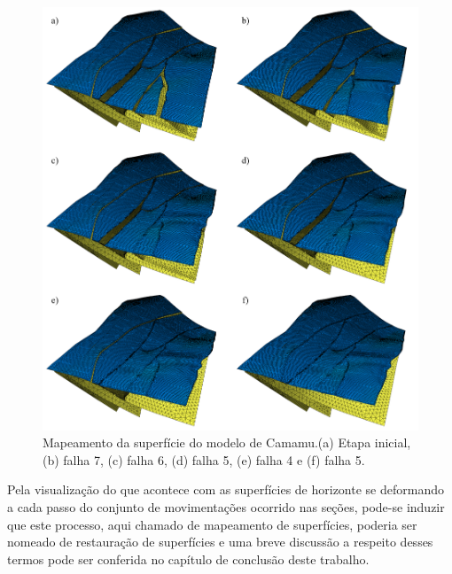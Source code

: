 \begin{figure} [H]
  \begin{center}
    \includegraphics[width=\textwidth]{images/fig-example-2-13}
    \caption{Mapeamento da superfície do modelo de Camamu.(a) Etapa inicial, (b) falha 7, (c) falha 6, (d) falha 5, (e) falha 4 e (f) falha 5.}\label{fig-example-2-13}
  \end{center}
\end{figure}

Pela visualização do que acontece com as superfícies de horizonte se deformando a cada passo do conjunto de movimentações ocorrido nas seções, pode-se induzir que este processo, aqui chamado de mapeamento de superfícies, poderia ser nomeado de restauração de superfícies e uma breve discussão a respeito desses termos pode ser conferida no capítulo de conclusão deste trabalho.


